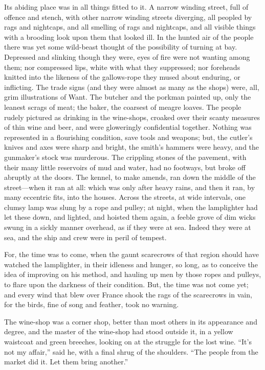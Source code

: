 Its abiding place was in all things fitted to it.  A narrow winding
street, full of offence and stench, with other narrow winding streets
diverging, all peopled by rags and nightcaps, and all smelling of
rags and nightcaps, and all visible things with a brooding look upon
them that looked ill.  In the hunted air of the people there was yet
some wild-beast thought of the possibility of turning at bay. Depressed
and slinking though they were, eyes of fire were not wanting among
them; nor compressed lips, white with what they suppressed; nor
foreheads knitted into the likeness of the gallows-rope they mused
about enduring, or inflicting.  The trade signs (and they were almost
as many as the shops) were, all, grim illustrations of Want.  The
butcher and the porkman painted up, only the leanest scrags of meat;
the baker, the coarsest of meagre loaves.  The people rudely pictured
as drinking in the wine-shops, croaked over their scanty measures of
thin wine and beer, and were gloweringly confidential together.
Nothing was represented in a flourishing condition, save tools and
weapons; but, the cutler's knives and axes were sharp and bright, the
smith's hammers were heavy, and the gunmaker's stock was murderous.
The crippling stones of the pavement, with their many little
reservoirs of mud and water, had no footways, but broke off abruptly
at the doors.  The kennel, to make amends, ran down the middle of the
street---when it ran at all:  which was only after heavy rains, and
then it ran, by many eccentric fits, into the houses.  Across the
streets, at wide intervals, one clumsy lamp was slung by a rope and
pulley; at night, when the lamplighter had let these down, and lighted,
and hoisted them again, a feeble grove of dim wicks swung in a sickly
manner overhead, as if they were at sea.  Indeed they were at sea,
and the ship and crew were in peril of tempest.

For, the time was to come, when the gaunt scarecrows of that region
should have watched the lamplighter, in their idleness and hunger,
so long, as to conceive the idea of improving on his method, and
hauling up men by those ropes and pulleys, to flare upon the
darkness of their condition.  But, the time was not come yet; and
every wind that blew over France shook the rags of the scarecrows
in vain, for the birds, fine of song and feather, took no warning.

The wine-shop was a corner shop, better than most others in its
appearance and degree, and the master of the wine-shop had stood
outside it, in a yellow waistcoat and green breeches, looking on at
the struggle for the lost wine.  ``It's not my affair,'' said he,
with a final shrug of the shoulders.  ``The people from the market
did it.  Let them bring another.''

